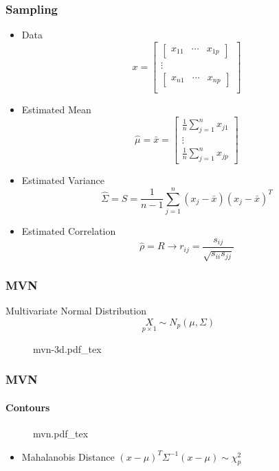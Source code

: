 \documentclass[aspectratio=169,10pt,t]{beamer}
\begin{document}
\begin{frame}[t]
    \frametitle{Sampling}
    \begin{itemize}
        \item Data
            \[
                x = 
                \begin{bmatrix}
                    \begin{bmatrix}
                        x_{11} & \cdots & x_{1p}
                    \end{bmatrix}\\
                    \vdots\\
                    \begin{bmatrix}
                        x_{n1} & \cdots & x_{np}
                    \end{bmatrix}\\
                \end{bmatrix}
            \] 
        \item Estimated Mean
            \[
                \hat{\mu} = \bar{x} = 
                \begin{bmatrix}
                    \frac{1}{n} \sum^{n}_{j=1} x_{j1}\\
                    \vdots\\
                    \frac{1}{n} \sum^{n}_{j=1} x_{jp}
                \end{bmatrix}
            \] 
        \item Estimated Variance
            \[
                \hat{\Sigma} = S = 
                \frac{1}{n-1} \sum^{n}_{j=1} 
                \left( x_j - \bar{x}  \right) 
                \left( x_j - \bar{x}  \right) ^{T}
            \] 
				\item Estimated Correlation
					\[
					\hat{\rho} = R
					\rightarrow
					r_{ij} = \frac{s_{ij}}{\sqrt{s_{ii} s_{jj}}} 
					\] 
    \end{itemize}
\end{frame}


\begin{frame}[t]
    \frametitle{MVN}

    Multivariate Normal Distribution
    \[
        \underset{p\times1}{X} \sim N_p(\mu, \Sigma)
    \] 
    \begin{figure}[H]
        \centering
				{mvn-3d.pdf_tex}
    \end{figure}

\end{frame}

\begin{frame}[t]
	\frametitle{MVN}
	\framesubtitle{Contours}
	\begin{figure}[h]
		\centering
		{mvn.pdf_tex}
	\end{figure}
	\pause
    \begin{itemize}
        \item Mahalanobis Distance $(x - \mu)^T \Sigma^{-1} (x - \mu)\sim \chi^2_p$
    \end{itemize}
\end{frame}
\end{document}
